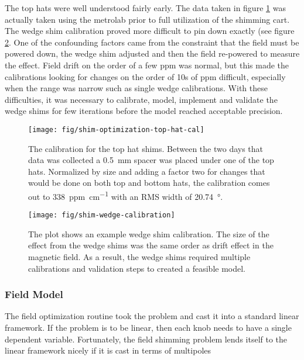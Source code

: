 The top hats were well understood fairly early.  The data taken in figure \ref{fig:shim-optimization-top-hat-cal} was actually taken using the metrolab prior to full utilization of the shimming cart.  The wedge shim calibration proved more difficult to pin down exactly (see figure \ref{fig:shim-wedge-calibration}.  One of the confounding factors came from the constraint that the field must be powered down, the wedge shim adjusted and then the field re-powered to measure the effect.  Field drift on the order of a few ppm was normal, but this made the calibrations looking for changes on the order of 10s of ppm difficult, especially when the range was narrow such as single wedge calibrations.  With these difficulties, it was necessary to calibrate, model, implement and validate the wedge shims for few iterations before the model reached acceptable precision.

\begin{figure}
\centering
\texttt{[image: fig/shim-optimization-top-hat-cal]}
\caption{
    The calibration for the top hat shims.  Between the two days that data was collected a \SI{0.5}{\milli\meter} spacer was placed under one of the top hats.  Normalized by size and adding a factor two for changes that would be done on both top and bottom hats, the calibration comes out to \SI{338}{ppm\per\centi\meter} with an RMS width of \SI{20.74}{\degree}. 
    \label{fig:shim-optimization-top-hat-cal}
}
\end{figure}

\begin{figure}
\centering
\texttt{[image: fig/shim-wedge-calibration]}
\caption{
    The plot shows an example wedge shim calibration.  The size of the effect from the wedge shims was the same order as drift effect in the magnetic field.  As a result, the wedge shims required multiple calibrations and validation steps to created a feasible model.
    \label{fig:shim-wedge-calibration}
}
\end{figure}

\subsubsection{Field Model}

The field optimization routine took the problem and cast it into a standard linear framework.  If the problem is to be linear, then each knob needs to have a single dependent variable.  Fortunately, the field shimming problem lends itself to the linear framework nicely if it is cast in terms of multipoles

